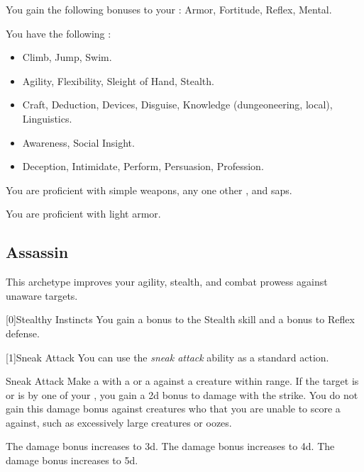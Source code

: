         You gain the following bonuses to your :  Armor,  Fortitude,  Reflex,  Mental.

        You have the following :
        \begin{itemize}
            \item {} Climb, Jump, Swim.
            \item {} Agility, Flexibility, Sleight of Hand, Stealth.
            \item {} Craft, Deduction, Devices, Disguise, Knowledge (dungeoneering, local), Linguistics.
            \item {} Awareness, Social Insight.
            \item {} Deception, Intimidate, Perform, Persuasion, Profession.
        \end{itemize}

        You are proficient with simple weapons, any one other , and saps.

        You are proficient with light armor.

    \newpage
    \subsection{Assassin}
        This archetype improves your agility, stealth, and combat prowess against unaware targets.

        [0]{Stealthy Instincts} You gain a  bonus to the Stealth skill and a  bonus to Reflex defense.

        [1]{Sneak Attack}
        You can use the \textit{sneak attack} ability as a standard action.
        \begin{freeability}{Sneak Attack}
            Make a  with a  or a  against a creature within \rngshort range.
            If the target is \unaware or is  by one of your , you gain a \plus2d bonus to damage with the strike.
            You do not gain this damage bonus against creatures who that you are unable to score a  against, such as excessively large creatures or oozes.

            \rankline
             The damage bonus increases to \plus3d.
             The damage bonus increases to \plus4d.
             The damage bonus increases to \plus5d.
        \end{freeability}

